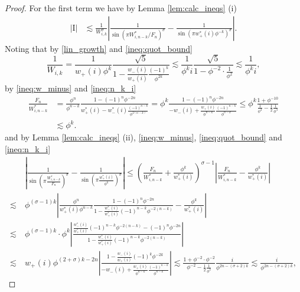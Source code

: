 \documentclass[]{interact}
\theoremstyle{definition}
\numberwithin{table}{section} %
\numberwithin{figure}{section}
\begin{document}
\begin{proof}
    For the first term we have by Lemma \ref{lem:calc_ineqs} (i)
    \begin{align*}
        |\text{I}| & \lesssim \frac{1}{W_{i, k}^\sigma} \left|\frac{1}{\sin(\pi W_{i, n-k}^*/F_n)^\sigma} - \frac{1}{\sin(\pi w_+^*(i) \phi^{-k})^\sigma}\right|.
    \end{align*}
    Noting that by \eqref{lin_growth} and \eqref{ineq:quot_bound}
    $$
    \frac1{W_{i, k}} = \frac1{w_+(i) \phi^k} \frac{\sqrt5}{1 - \frac{w_-(i)}{w_+(i)} \frac{(-1)^k}{\phi^{2k}}} \lesssim \frac{1}{\phi^k i} \frac{\sqrt5}{1 - \phi^{-2} \cdot \frac1{\phi^2}} \lesssim \frac{1}{\phi^k i},
    $$
    by \eqref{ineq:w_minus} and \eqref{ineq:n_k_i}
    \begin{align*}
        \frac{F_n}{W_{i, n-k}^*} & = \frac{\phi^n}{\phi^{n-k}} \frac{1-(-1)^n \phi^{-2n}}{w_+^*(i)-w_-^*(i) \frac{(-1)^{n-k}}{\phi^{2(n-k)}} } = \phi^k \frac{1-(-1)^n \phi^{-2n}}{-w_-(i)+\frac{w_+(i)}{\phi^{n-k}} \frac{(-1)^{n-k}}{\phi^{n-k}} } \leq \phi^k\frac{1+\phi^{-10}}{\frac1{\phi^2}-\frac12 \frac1{\phi^3}} \\
        & \lesssim \phi^k.
    \end{align*}
    and by Lemma \ref{lem:calc_ineqs} (ii), \eqref{ineq:w_minus}, \eqref{ineq:quot_bound} and \eqref{ineq:n_k_i}
    \begin{align*}
        & \left|\frac{1}{\sin\left(\pi \frac{W_{i, n-k}^*}{F_n}\right)^\sigma} - \frac{1}{\sin\left(\pi \frac{w_+^*(i)}{\phi^{k}}\right)^\sigma}\right| \leq \left(\frac{F_n}{W_{i, n-k}^*} + \frac{\phi^k}{w_+^*(i)}\right)^{\sigma-1} \left|\frac{F_n}{W_{i, n-k}^*} - \frac{\phi^k}{w_+^*(i)}\right| \\
        \lesssim ~ & \phi^{(\sigma-1)k} \left|\frac{\phi^n}{w_+^*(i) \phi^{n-k}} \frac{1-(-1)^n\phi^{-2n}}{1-\frac{w_-^*(i)}{w_+^*(i)} (-1)^{n-k} \phi^{-2(n-k)}} - \frac{\phi^k}{w_+^*(i)}\right| \\
        \lesssim ~ & \phi^{(\sigma-1)k} \cdot \phi^k \left|\frac{\frac{w_-^*(i)}{w_+^*(i)} (-1)^{n-k} \phi^{-2(n-k)}-(-1)^n \phi^{-2n}}{1-\frac{w_-^*(i)}{w_+^*(i)} (-1)^{n-k} \phi^{-2(n-k)}}\right| \\
        \lesssim ~ & w_+(i) \phi^{(2+\sigma) k - 2n} \left|\frac{1-\frac{w_-(i)}{w_+(i)} (-1)^k \phi^{-2k}}{-w_-(i)+\frac{w_+(i)}{\phi^{n-k}} \frac{(-1)^{n-k}}{\phi^{n-k}}}\right| \lesssim \frac{1+\phi^{-2} \cdot \phi^{-2}}{\phi^{-2} - \frac12 \frac1{\phi^3}} \frac{i}{\phi^{2n-(\sigma+2)k}} \lesssim \frac{i}{\phi^{2n-(\sigma+2)k}},

\end{align*}
\end{proof}
\end{document}
